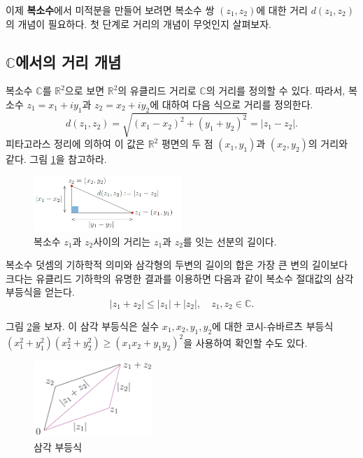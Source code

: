이제 {\bf 복소수}에서 미적분을 만들어 보려면
복소수 쌍 $(z_1, z_2)$에 대한 거리 $d(z_1, z_2)$의 개념이 필요하다.
첫 단계로 거리의 개념이 무엇인지 살펴보자.

\subsection{$\mathbb C$에서의 거리 개념}

복소수 $\mathbb C$를 $\mathbb R^2$으로 보면 $\mathbb R^2$의 유클리드 거리로
$\mathbb C$의 거리를 정의할 수 있다.
따라서, 복소수 $z_1=x_1+iy_1$과 $z_2=x_2+iy_2$에 대하여 
다음 식으로 거리를 정의한다.
$$
d(z_1,z_2) = \sqrt{(x_1-x_2)^2 + (y_1+y_2)^2} = |z_1-z_2|.
$$
피타고라스 정리에 의하여 이 값은 $\mathbb R^2$ 평면의 두 점 $(x_1, y_1)$과 $(x_2, y_2)$의 거리와 같다.
그림 \ref{fig-1-10}을 참고하라.

\begin{figure}[!h]
\begin{center}
\includegraphics[width=0.5\textwidth]{./SaltChapter/figs/fig-1-10}
\end{center}
\caption{복소수 $z_1$과 $z_2$사이의 거리는 $z_1$과 $z_2$를 잇는 선분의 길이다.}
\label{fig-1-10}
\end{figure}

복소수 덧셈의 기하학적 의미와 
삼각형의 두변의 길이의 합은 가장 큰 변의 길이보다 크다는 
유클리드 기하학의 유명한 결과를 이용하면
다음과 같이 복소수 절대값의 삼각 부등식을 얻는다.
$$
|z_1+z_2| \le |z_1|  + |z_2|, \quad z_1, z_2\in\mathbb C.
$$

그림 \ref{fig-1-11}을 보자.
이 삼각 부등식은 실수 $x_1, x_2, y_1, y_2$에 대한 코시-슈바르츠 부등식
$(x_1^2+y_1^2) (x_2^2+y_2^2) \ge (x_1x_2 + y_1y_2)^2$을 사용하여
확인할 수도 있다.


\begin{figure}[!h]
\begin{center}
\includegraphics[width=0.4\textwidth]{./SaltChapter/figs/fig-1-11}
\end{center}
\caption{삼각 부등식}
\label{fig-1-11}
\end{figure}

